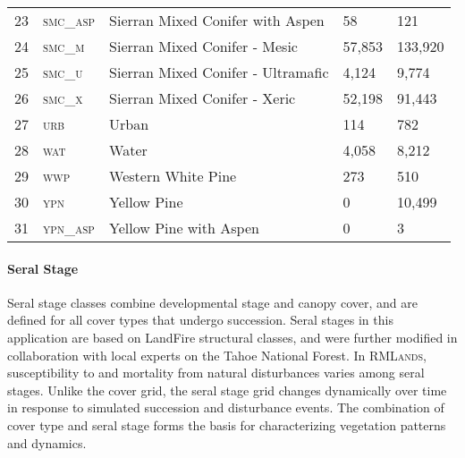 \begin{table}[!htbp]
\begin{tabular}{@{}lllll@{}}
\rowcolor[HTML]{CAD6BA} 23   & \textsc{smc\_asp}     & Sierran Mixed Conifer with Aspen             & 58    		    & 121            \\
24                           & \textsc{smc\_m  }     & Sierran Mixed Conifer - Mesic                & 57,853 	      & 133,920        \\
\rowcolor[HTML]{CAD6BA} 25   & \textsc{smc\_u  }     & Sierran Mixed Conifer - Ultramafic           & 4,124  	      & 9,774          \\
26                           & \textsc{smc\_x  }     & Sierran Mixed Conifer - Xeric                & 52,198 	      & 91,443         \\
\rowcolor[HTML]{CAD6BA} 27   & \textsc{urb     }     & Urban                                        & 114   		    & 782            \\
28                           & \textsc{wat     }     & Water                                        & 4,058  	      & 8,212          \\
\rowcolor[HTML]{CAD6BA} 29   & \textsc{wwp     }     & Western White Pine                           & 273   		    & 510            \\
30                           & \textsc{ypn     }     & Yellow Pine                                  & 0     		    & 10,499         \\
\rowcolor[HTML]{CAD6BA} 31   & \textsc{ypn\_asp}     & Yellow Pine with Aspen                       & 0     		    & 3              \\ \bottomrule
\end{tabular}
\end{table}
\normalsize

\paragraph{Seral Stage}
Seral stage classes combine developmental stage and canopy cover, and are defined for all cover types that undergo succession. Seral stages in this application are based on LandFire structural classes, and were further modified in collaboration with local experts on the Tahoe National Forest. In \textsc{RMLands}, susceptibility to and mortality from natural disturbances varies among seral stages. Unlike the cover grid, the seral stage grid changes dynamically over time in response to simulated succession and disturbance events. The combination of cover type and seral stage forms the basis for characterizing vegetation patterns and dynamics.

